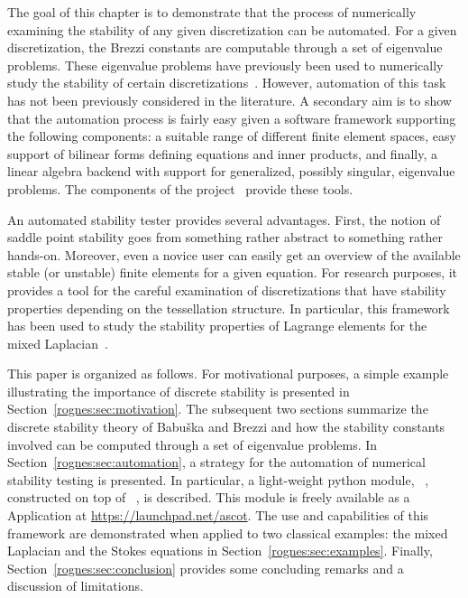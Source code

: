 The goal of this chapter is to demonstrate that the process of
numerically examining the stability of any given discretization can be
automated. For a given discretization, the Brezzi constants are
computable through a set of eigenvalue problems. These eigenvalue
problems have previously been used to numerically study the stability
of certain discretizations~\cite{ArnoldRognes2009, ChapelleBathe1993,
  Qin1994}. However, automation of this task has not been previously
considered in the literature. A secondary aim is to show that the
automation process is fairly easy given a software framework
supporting the following components: a suitable range of different
finite element spaces, easy support of bilinear forms defining
equations and inner products, and finally, a linear algebra backend
with support for generalized, possibly singular, eigenvalue
problems. The components of the \fenics{} project~\cite{www:fenics}
provide these tools.

An automated stability tester provides several advantages. First, the
notion of saddle point stability goes from something rather abstract
to something rather hands-on. Moreover, even a novice user can easily
get an overview of the available stable (or unstable) finite elements
for a given equation. For research purposes, it provides a tool for
the careful examination of discretizations that have stability
properties depending on the tessellation structure. In particular,
this framework has been used to study the stability properties of
Lagrange elements for the mixed Laplacian~\cite{ArnoldRognes2009}.

This paper is organized as follows. For motivational purposes, a
simple example illustrating the importance of discrete stability is
presented in Section~\ref{rognes:sec:motivation}. The subsequent two
sections summarize the discrete stability theory of Babu\v ska and
Brezzi and how the stability constants involved can be computed
through a set of eigenvalue problems. In
Section~\ref{rognes:sec:automation}, a strategy for the automation of
numerical stability testing is presented. In particular, a
light-weight python module, \rognesascot{}~\cite{www:ascot},
constructed on top of \pydolfin{}~\cite{LoggWells2009}, is
described. This module is freely available as a \fenics{} Application
at \url{https://launchpad.net/ascot}. The use and capabilities of this
framework are demonstrated when applied to two classical examples: the
mixed Laplacian and the Stokes equations in
Section~\ref{rognes:sec:examples}. Finally,
Section~\ref{rognes:sec:conclusion} provides some concluding remarks
and a discussion of limitations.

